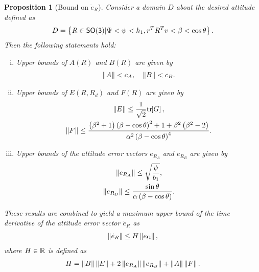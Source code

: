 \documentclass[letterpaper, 10 pt, conference]{ieeeconf}  %
\newtheorem{prop}{Proposition}
\begin{document}
\begin{prop}[Bound on \( \dot{e}_R \)]\label{prop:eR_dot_bound}
Consider a domain \( D \) about the desired attitude defined as
\begin{align}
	D = \left\{ R \in \mathsf{SO(3)} \vert \Psi < \psi < h_1, r^T R^T v < \beta < \cos \theta \right\}. \label{eqn:domain}
\end{align}
Then the following statements hold:
\begin{enumerate}[(i)]
	\item \label{item:prop_eR_dot_bound_AB} Upper bounds of \( A(R) \) and \( B(R) \) are given by
	\begin{gather}
		\left\| A \right\| < c_A  , \quad \left\| B \right\| < c_B . \label{eqn:AB_bound}
	\end{gather}
	\item \label{item:prop_eR_dot_bound_EF} Upper bounds of \( E(R,R_d) \) and \( F(R) \) are given by
	\begin{gather}
		\left\| E \right\| \leq \frac{1}{\sqrt{2}} \mathrm{tr}\negthickspace\left[ G \right]  , \label{eqn:E_bound} \\
		\left\| F \right\| \leq \frac{\left( \beta^2 + 1 \right)\left( \beta - \cos \theta \right)^2 + 1 + \beta^2 \left( \beta^2-2 \right)}{\alpha^2 \left( \beta-\cos \theta \right)^4} . \label{eqn:F_bound}
	\end{gather}
	\item Upper bounds of the attitude error vectors \( e_{R_A} \) and \( e_{R_B} \) are given by
	\begin{gather}
		\left\| e_{R_A} \right\| \leq \sqrt{\frac{\psi}{b_1}}, \label{eqn:eRA_bound} \\
		\left\| e_{R_B} \right\| \leq \frac{\sin\theta}{\alpha \left( \beta - \cos \theta \right)}. \label{eqn:eRB_bound}
	\end{gather}
\end{enumerate}
These results are combined to yield a maximum upper bound of the time derivative of the attitude error vector \( \dot{e}_R \) as
\begin{gather}
	\left\| \dot{e}_R \right\| \leq H \left\| e_\Omega \right\| ,\label{eqn:eR_bound}
\end{gather}
where  \( H \in \mathbb{R} \) is defined as
\begin{gather}
	H = \left\| B \right\| \left\| E \right\| + 2 \left\| e_{R_A} \right\| \left\| e_{R_B} \right\| + \left\| A \right\|\left\| F \right\|. \label{eqn:H}
\end{gather}
\end{prop}
\end{document}
